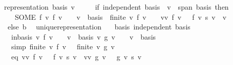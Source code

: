 \begin{isabellebody}
\ \ \ {\isachardoublequoteopen}representation\ basis\ v\ {\isacharequal}{\kern0pt}\isanewline
\ \ \ \ {\isacharparenleft}{\kern0pt}if\ independent\ basis\ {\isasymand}\ v\ {\isasymin}\ span\ basis\ then\isanewline
\ \ \ \ \ \ SOME\ f{\isachardot}{\kern0pt}\ {\isacharparenleft}{\kern0pt}{\isasymforall}v{\isachardot}{\kern0pt}\ f\ v\ {\isasymnoteq}\ {}\ {\isasymlongrightarrow}\ v\ {\isasymin}\ basis{\isacharparenright}{\kern0pt}\ {\isasymand}\ finite\ {\isacharbraceleft}{\kern0pt}v{\isachardot}{\kern0pt}\ f\ v\ {\isasymnoteq}\ {}{\isacharbraceright}{\kern0pt}\ {\isasymand}\ {\isacharparenleft}{\kern0pt}{\isasymSum}v{\isasymin}{\isacharbraceleft}{\kern0pt}v{\isachardot}{\kern0pt}\ f\ v\ {\isasymnoteq}\ {}{\isacharbraceright}{\kern0pt}{\isachardot}{\kern0pt}\ f\ v\ {\isacharasterisk}{\kern0pt}s\ v{\isacharparenright}{\kern0pt}\ {\isacharequal}{\kern0pt}\ v\isanewline
\ \ \ \ else\ {\isacharparenleft}{\kern0pt}{\isasymlambda}b{\isachardot}{\kern0pt}\ {}{\isacharparenright}{\kern0pt}{\isacharparenright}{\kern0pt}{\isachardoublequoteclose}\isanewline
\isanewline
{}\isamarkupfalse%
\ unique{\isacharunderscore}{\kern0pt}representation{\isacharcolon}{\kern0pt}\isanewline
\ \ \ basis{\isacharcolon}{\kern0pt}\ {\isachardoublequoteopen}independent\ basis{\isachardoublequoteclose}\isanewline
\ \ \ \ \ in{\isacharunderscore}{\kern0pt}basis{\isacharcolon}{\kern0pt}\ {\isachardoublequoteopen}{\isasymAnd}v{\isachardot}{\kern0pt}\ f\ v\ {\isasymnoteq}\ {}\ {\isasymLongrightarrow}\ v\ {\isasymin}\ basis{\isachardoublequoteclose}\ {\isachardoublequoteopen}{\isasymAnd}v{\isachardot}{\kern0pt}\ g\ v\ {\isasymnoteq}\ {}\ {\isasymLongrightarrow}\ v\ {\isasymin}\ basis{\isachardoublequoteclose}\isanewline
\ \ \ \ \ {\isacharbrackleft}{\kern0pt}simp{\isacharbrackright}{\kern0pt}{\isacharcolon}{\kern0pt}\ {\isachardoublequoteopen}finite\ {\isacharbraceleft}{\kern0pt}v{\isachardot}{\kern0pt}\ f\ v\ {\isasymnoteq}\ {}{\isacharbraceright}{\kern0pt}{\isachardoublequoteclose}\ {\isachardoublequoteopen}finite\ {\isacharbraceleft}{\kern0pt}v{\isachardot}{\kern0pt}\ g\ v\ {\isasymnoteq}\ {}{\isacharbraceright}{\kern0pt}{\isachardoublequoteclose}\isanewline
\ \ \ \ \ eq{\isacharcolon}{\kern0pt}\ {\isachardoublequoteopen}{\isacharparenleft}{\kern0pt}{\isasymSum}v{\isasymin}{\isacharbraceleft}{\kern0pt}v{\isachardot}{\kern0pt}\ f\ v\ {\isasymnoteq}\ {}{\isacharbraceright}{\kern0pt}{\isachardot}{\kern0pt}\ f\ v\ {\isacharasterisk}{\kern0pt}s\ v{\isacharparenright}{\kern0pt}\ {\isacharequal}{\kern0pt}\ {\isacharparenleft}{\kern0pt}{\isasymSum}v{\isasymin}{\isacharbraceleft}{\kern0pt}v{\isachardot}{\kern0pt}\ g\ v\ {\isasymnoteq}\ {}{\isacharbraceright}{\kern0pt}{\isachardot}{\kern0pt}\ g\ v\ {\isacharasterisk}{\kern0pt}s\ v{\isacharparenright}{\kern0pt}{\isachardoublequoteclose}\isanewline

\end{isabellebody}
